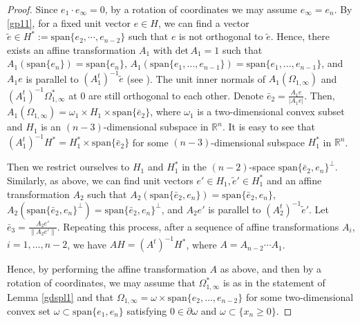 \documentclass[11pt]{amsart}
\theoremstyle{plain}
\renewcommand{\det}{\mbox{det}}
\newcommand{\0}{\textbf{0}}
\numberwithin{equation}{section}
\numberwithin{equation}{section}
\numberwithin{figure}{section}
\begin{document}
\begin{proof}
Since \( e_1 \cdot e_\infty = 0 \), by a rotation of coordinates we may assume \( e_\infty = e_n \).
By \eqref{gp11}, for a fixed unit vector \( e \in H \), we can find a vector \( \tilde{e} \in H^* := \text{span}\{e_2, \cdots, e_{n-2}\} \) such that \( e \) is not orthogonal to \( \tilde{e} \).
Hence, there exists an affine transformation \( A_1 \) with \( \det\, A_1 = 1 \) such that \( A_1(\text{span}\{e_n\}) = \text{span}\{e_n\} \), \( A_1(\text{span}\{e_1, \ldots, e_{n-1}\}) = \text{span}\{e_1, \ldots, e_{n-1}\} \),
and \( A_1e \) is parallel to \( (A_1^t)^{-1}\tilde{e} \) (see \cite[(3.2)]{CLW3}).
 The unit inner normals of \( A_1(\Omega_{1,\infty}) \) and \( (A_1^t)^{-1}\Omega^*_{1,\infty} \) at \( 0 \) are still orthogonal to each other. Denote \( \bar{e}_2 = \frac{A_1e}{|A_1e|} \). Then, \( A_1(\Omega_{1,\infty}) = \omega_1 \times H_1 \times \text{span}\{\bar{e}_2\} \), where \( \omega_1 \) is a two-dimensional convex subset and \( H_1 \) is an \( (n-3) \)-dimensional subspace in \( \mathbb{R}^n \).  It is easy to see that \( (A_1^t)^{-1}H^* = H^*_1 \times \text{span}\{\bar{e}_2\} \) for some \( (n-3) \)-dimensional subspace \( H^*_1 \)  in \( \mathbb{R}^n \).

Then we restrict ourselves to \( H_1 \) and \( H^*_1 \) in the \((n-2)\)-space \( \text{span}\{\bar{e}_2, e_n\}^\bot \).
Similarly, as above, we can find unit vectors \( e' \in H_1, \tilde{e}' \in H^*_1 \) and an affine transformation \( A_2 \) such that
\( A_2(\text{span}\{\bar{e}_2, e_n\}) = \text{span}\{\bar{e}_2, e_n\} \), \( A_2( \text{span}\{\bar{e}_2, e_n\}^\bot ) = \text{span}\{\bar{e}_2, e_n\}^\bot \),
and \( A_2e' \) is parallel to \( (A_2^t)^{-1}\tilde{e}' \).
Let \( \bar{e}_3 = \frac{A_2e'}{\|A_2e'\|} \). Repeating this process, after a sequence of affine transformations \( A_i \), \( i=1, \ldots, n-2 \), we have \( AH = (A^t)^{-1}H^* \), where \( A = A_{n-2} \cdots A_1 \).


Hence, by performing the affine transformation \( A \) as above, and then by a rotation of coordinates, we may assume that 
\( \Omega_{1, \infty}^* \) is as in the statement of Lemma \ref{gdspl1} and that
\( \Omega_{1,\infty} = \omega \times \text{span}\{e_2, \ldots, e_{n-2}\} \) for some two-dimensional convex set \( \omega \subset \text{span}\{e_1, e_n\} \) satisfying \( 0 \in \partial \omega \) and \( \omega \subset \{x_n \geq 0\} \).


\end{proof}
\end{document}
